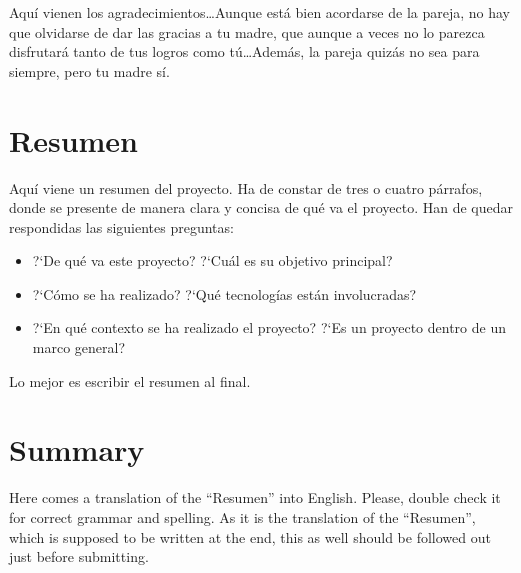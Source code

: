 \documentclass[a4paper, spanish, 12pt]{book}
\begin{document}
Aqu\'i vienen los agradecimientos\ldots Aunque est\'a bien acordarse de la pareja,
no hay que olvidarse de dar las gracias a tu madre, que aunque a veces no lo
parezca disfrutar\'a tanto de tus logros como t\'u\ldots Adem\'as, la pareja quiz\'as
no sea para siempre, pero tu madre s\'i.


\chapter*{Resumen}

Aqu\'i viene un resumen del proyecto. Ha de constar de tres o cuatro p\'arrafos,
donde se presente de manera clara y concisa de qu\'e va el proyecto. Han
de quedar respondidas las siguientes preguntas:

\begin{itemize}
  \item ?`De qu\'e va este proyecto? ?`Cu\'al es su objetivo principal?
  \item ?`C\'omo se ha realizado? ?`Qu\'e tecnolog\'ias est\'an involucradas?
  \item ?`En qu\'e contexto se ha realizado el proyecto? ?`Es un proyecto
dentro de un marco general?
\end{itemize}

Lo mejor es escribir el resumen al final.


\chapter*{Summary}

Here comes a translation of the ``Resumen'' into English. Please, double check
it for correct grammar and spelling. As it is the translation of the ``Resumen'',
which is supposed to be written at the end, this as well should be followed out
just before submitting.


\end{document}
